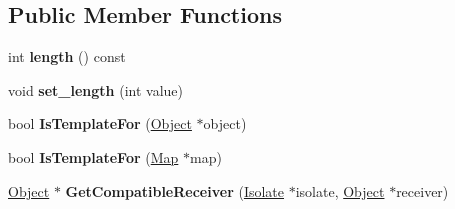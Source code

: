 \subsection*{Public Member Functions}
\begin{DoxyCompactItemize}
\item 
int {\bfseries length} () const \hypertarget{classv8_1_1internal_1_1_function_template_info_a6d8bda16d223be7b324990226db7cadb}{}\label{classv8_1_1internal_1_1_function_template_info_a6d8bda16d223be7b324990226db7cadb}

\item 
void {\bfseries set\+\_\+length} (int value)\hypertarget{classv8_1_1internal_1_1_function_template_info_a53eeebcf90c65b5dcfe97b7cb452f0bc}{}\label{classv8_1_1internal_1_1_function_template_info_a53eeebcf90c65b5dcfe97b7cb452f0bc}

\item 
bool {\bfseries Is\+Template\+For} (\hyperlink{classv8_1_1internal_1_1_object}{Object} $\ast$object)\hypertarget{classv8_1_1internal_1_1_function_template_info_ac8ff72779008703bc0dd4f7ab12c56bb}{}\label{classv8_1_1internal_1_1_function_template_info_ac8ff72779008703bc0dd4f7ab12c56bb}

\item 
bool {\bfseries Is\+Template\+For} (\hyperlink{classv8_1_1internal_1_1_map}{Map} $\ast$map)\hypertarget{classv8_1_1internal_1_1_function_template_info_a4697f335fb987b0a42d1167b89ec330f}{}\label{classv8_1_1internal_1_1_function_template_info_a4697f335fb987b0a42d1167b89ec330f}

\item 
\hyperlink{classv8_1_1internal_1_1_object}{Object} $\ast$ {\bfseries Get\+Compatible\+Receiver} (\hyperlink{classv8_1_1internal_1_1_isolate}{Isolate} $\ast$isolate, \hyperlink{classv8_1_1internal_1_1_object}{Object} $\ast$receiver)\hypertarget{classv8_1_1internal_1_1_function_template_info_a431e3ca6e900db99e12d983de4eaa89e}{}\label{classv8_1_1internal_1_1_function_template_info_a431e3ca6e900db99e12d983de4eaa89e}

\end{DoxyCompactItemize}
